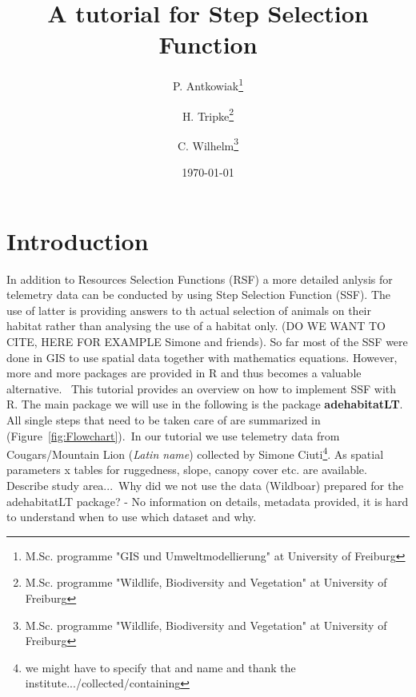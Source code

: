 \documentclass[11pt, a4paper]{article} %
\begin{document}



\title{A tutorial for Step Selection Function}

\author{P. Antkowiak\thanks{M.Sc. programme "GIS und Umweltmodellierung" at University of Freiburg} \and H. Tripke\thanks{M.Sc. programme "Wildlife, Biodiversity and Vegetation" at University of Freiburg} \and C. Wilhelm\thanks{M.Sc. programme "Wildlife, Biodiversity and Vegetation" at University of Freiburg}}

\date{\today} %

\maketitle


\tableofcontents

\newpage

\section{Introduction}%
In addition to Resources Selection Functions (RSF) a more detailed anlysis for telemetry data can be conducted by using Step Selection Function (SSF). The use of latter is providing answers to th actual selection of animals on their habitat rather than analysing the use of a habitat only. (DO WE WANT TO CITE, HERE FOR EXAMPLE Simone and friends). So far most of the SSF were done in GIS to use spatial data together with mathematics equations. However, more and more packages are provided in R and thus becomes a valuable alternative. \
This tutorial provides an overview on how to implement SSF with R. The main package we will use in the following is the package \textbf{adehabitatLT}. All single steps that need to be taken care of are summarized in (Figure~\ref{fig:Flowchart}).\
In our tutorial we use telemetry data from Cougars/Mountain Lion (\textit{Latin name}) collected by Simone Ciuti\footnote{we might have to specify that and name and thank the institute.../collected/containing}. As spatial parameters x tables for ruggedness, slope, canopy cover etc. are available. Describe study area...\
Why did we not use the data (Wildboar) prepared for the adehabitatLT package? - No information on details, metadata provided, it is hard to understand when to use which dataset and why.
\end{document}
